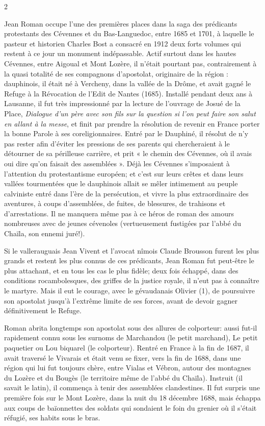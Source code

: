 {\fontsize{9.65}{11.05}\selectfont
\begin{multicols}{2}

Jean Roman occupe l’une des premières places dans la saga des prédicants protestants des Cévennes et du Bas-Languedoc, entre 1685 et 1701, à laquelle le pasteur et historien Charles Bost a consacré en 1912 deux forts volumes qui restent à ce jour un monument indépassable. Actif surtout dans les hautes Cévennes, entre Aigoual et Mont Lozère, il n’était pourtant pas, contrairement à la quasi totalité de ses compagnons d’apostolat, originaire de la région : dauphinois, il était né à Vercheny, dans la vallée de la Drôme, et avait gagné le Refuge à la Révocation de l’Edit de Nantes (1685). Installé pendant deux ans à Lausanne, il fut très impressionné par la lecture de l’ouvrage de Josué de la Place, \textit{Dialogue d’un père avec son fils sur la question si l’on peut faire son salut en allant à la messe}, et finit par prendre la résolution de revenir en France porter la bonne Parole à ses coreligionnaires. Entré par le Dauphiné, il résolut de n’y pas rester afin d’éviter les pressions de ses parents qui chercheraient à le détourner de sa périlleuse carrière, et prit « le chemin des Cévennes, où il avais oui dire qu’on faisait des assemblées ». Déjà les Cévennes s’imposaient à l’attention du protestantisme européen; et c’est sur leurs crêtes et dans leurs vallées tourmentées que le dauphinois allait se mêler intimement au peuple calviniste entré dans l’ère de la persécution, et vivre la plus extraordinaire des aventures, à coups d’assemblées, de fuites, de blessures, de trahisons et d’arrestations. Il ne manquera même pas à ce héros de roman des amours nombreuses avec de jeunes cévenoles (vertueusement fustigées par l’abbé du Chaïla, son ennemi juré!).

Si le vallerauguais Jean Vivent et l’avocat nîmois Claude Brousson furent les plus grands et restent les plus connus de ces prédicants, Jean Roman fut peut-être le plus attachant, et en tous les cas le plus fidèle; deux fois échappé, dans des conditions rocambolesques, des griffes de la justice royale, il n’eut pas à connaître le martyre. Mais il eut le courage, avec le gévaudanais Olivier (1), de poursuivre son apostolat jusqu’à l’extrême limite de ses forces, avant de devoir gagner définitivement le Refuge.

Roman abrita longtemps son apostolat sous des allures de colporteur: aussi fut-il rapidement connu sous les surnoms de Marchandou (le petit marchand), Le petit paquetier ou Lou biquarel (le colporteur). Rentré en France à la fin de 1687, il avait traversé le Vivarais et était venu se fixer, vers la fin de 1688, dans une région qui lui fut toujours chère, entre Vialas et Vébron, autour des montagnes du Lozère et du Bougès (le territoire même de l’abbé du Chaïla). Instruit (il savait le latin), il commença à tenir des assemblées clandestines. Il fut surpris une première fois sur le Mont Lozère, dans la nuit du 18 décembre 1688, mais échappa aux coups de baïonnettes des soldats qui sondaient le foin du grenier où il s’était réfugié, ses habits sous le bras.


\end{multicols}}

